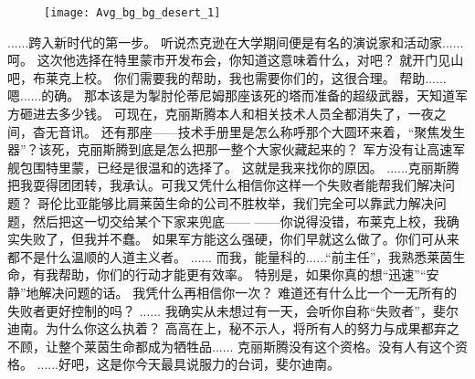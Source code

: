 \documentclass[openany]{book}
\begin{document}
\begin{figure}[h]
    \centering
    \texttt{[image: Avg\_bg\_bg\_desert\_1]}
\end{figure}
\begin{dialogue}
     ......跨入新时代的第一步。
     听说杰克逊在大学期间便是有名的演说家和活动家......呵。
     这次他选择在特里蒙市开发布会，你知道这意味着什么，对吧？
     就开门见山吧，布莱克上校。
     你们需要我的帮助，我也需要你们的，这很合理。
     帮助......嗯......的确。
     那本该是为掣肘伦蒂尼姆那座该死的塔而准备的超级武器，天知道军方砸进去多少钱。
     可现在，克丽斯腾本人和相关技术人员全都消失了，一夜之间，杳无音讯。
     还有那座——技术手册里是怎么称呼那个大圆环来着，“聚焦发生器”？该死，克丽斯腾到底是怎么把那一整个大家伙藏起来的？
     军方没有让高速军舰包围特里蒙，已经是很温和的选择了。
     这就是我来找你的原因。
     ......克丽斯腾把我耍得团团转，我承认。可我又凭什么相信你这样一个失败者能帮我们解决问题？
     哥伦比亚能够比肩莱茵生命的公司不胜枚举，我们完全可以靠武力解决问题，然后把这一切交给某个下家来兜底——
     ——你说得没错，布莱克上校，我确实失败了，但我并不蠢。
     如果军方能这么强硬，你们早就这么做了。你们可从来都不是什么温顺的人道主义者。
     ......
     而我，能量科的......“前主任”，我熟悉莱茵生命，有我帮助，你们的行动才能更有效率。
     特别是，如果你真的想“迅速”“安静”地解决问题的话。
     我凭什么再相信你一次？
     难道还有什么比一个一无所有的失败者更好控制的吗？
     ......
     我确实从未想过有一天，会听你自称“失败者”，斐尔迪南。为什么你这么执着？
     高高在上，秘不示人，将所有人的努力与成果都弃之不顾，让整个莱茵生命都成为牺牲品......
     克丽斯腾没有这个资格。没有人有这个资格。
     ......好吧，这是你今天最具说服力的台词，斐尔迪南。
\end{dialogue}
\end{document}
